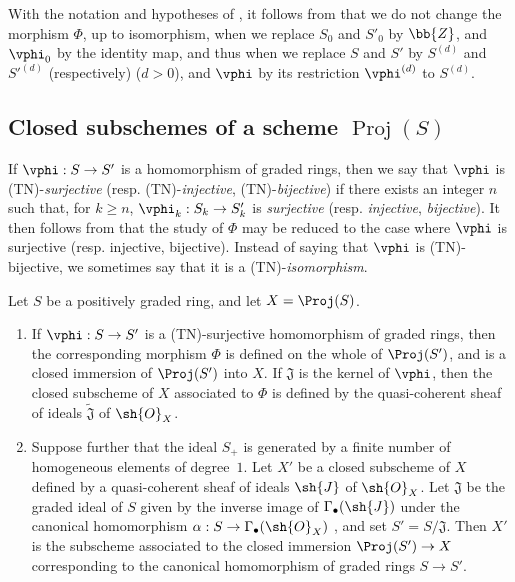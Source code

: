 \begin{env}[2.8.15]
\label{II.2.8.15}
With the notation and hypotheses of , it follows from  that we do not change the morphism $\Phi$, up to isomorphism, when we replace $S_0$ and $S'_0$ by $\bb{Z}$, and $\vphi_0$ by the identity map, and thus when we replace $S$ and $S'$ by $S^{(d)}$ and ${S'}^{(d)}$ (respectively) ($d>0$), and $\vphi$ by its restriction $\vphi^{(d)}$ to $S^{(d)}$.
\end{env}


\subsection{Closed subschemes of a scheme $\operatorname{Proj}(S)$}
\label{subsection:II.2.9}

\begin{env}[2.9.1]
\label{II.2.9.1}
If $\vphi:S\to S'$ is a homomorphism of graded rings, then we say that $\vphi$ is (TN)-\emph{surjective} (resp. (TN)-\emph{injective}, (TN)-\emph{bijective}) if there exists an integer $n$ such that, for $k\geq n$, $\vphi_k:S_k\to S'_k$ is \emph{surjective} (resp. \emph{injective}, \emph{bijective}).
It then follows from  that the study of $\Phi$ may be reduced to the case where $\vphi$ is surjective (resp. injective, bijective).
Instead of saying that $\vphi$ is (TN)-bijective, we sometimes say that it is a (TN)-\emph{isomorphism}.
\end{env}

\begin{proposition}[2.9.2]
\label{II.2.9.2}
Let $S$ be a positively graded ring, and let $X=\Proj(S)$.
\begin{enumerate}
  \item[\rm{(i)}] If $\vphi:S\to S'$ is a (TN)-surjective homomorphism of graded rings, then the corresponding morphism $\Phi$  is defined on the whole of $\Proj(S')$, and is a closed immersion of $\Proj(S')$ into $X$.
    If $\mathfrak{J}$ is the kernel of $\vphi$, then the closed subscheme of $X$ associated to $\Phi$ is defined by the quasi-coherent sheaf of ideals $\widetilde{\mathfrak{J}}$ of $\sh{O}_X$.
  \item[\rm{(ii)}] Suppose further that the ideal $S_+$ is generated by a finite number of homogeneous elements of degree~$1$.
    Let $X'$ be a closed subscheme of $X$ defined by a quasi-coherent sheaf of ideals $\sh{J}$ of $\sh{O}_X$.
    Let $\mathfrak{J}$ be the graded ideal of $S$ given by the inverse image of $\Gamma_\bullet(\sh{J})$ under the canonical homomorphism $\alpha:S\to\Gamma_\bullet(\sh{O}_X)$ , and set $S'=S/\mathfrak{J}$.
    Then $X'$ is the subscheme associated to the closed immersion $\Proj(S')\to X$ corresponding to the canonical homomorphism of graded rings $S\to S'$.
\end{enumerate}
\end{proposition}


